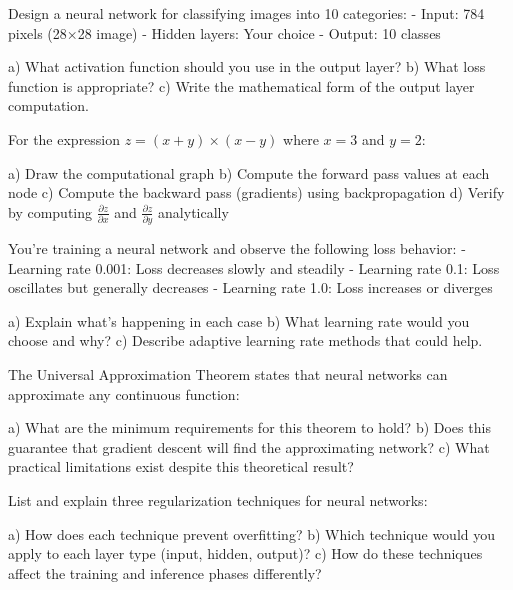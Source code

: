 \documentclass{article}
\begin{document}
\begin{problembox}[title= Multi-class Classification]

Design a neural network for classifying images into 10 categories:
- Input: 784 pixels (28×28 image)
- Hidden layers: Your choice
- Output: 10 classes

a) What activation function should you use in the output layer?
b) What loss function is appropriate?
c) Write the mathematical form of the output layer computation.
\end{problembox}

\begin{problembox}[title= Computational Graph]

For the expression $z = (x + y) \times (x - y)$ where $x = 3$ and $y = 2$:

a) Draw the computational graph
b) Compute the forward pass values at each node
c) Compute the backward pass (gradients) using backpropagation
d) Verify by computing $\frac{\partial z}{\partial x}$ and $\frac{\partial z}{\partial y}$ analytically
\end{problembox}

\begin{problembox}[title= Learning Rate Analysis]

You're training a neural network and observe the following loss behavior:
- Learning rate 0.001: Loss decreases slowly and steadily
- Learning rate 0.1: Loss oscillates but generally decreases
- Learning rate 1.0: Loss increases or diverges

a) Explain what's happening in each case
b) What learning rate would you choose and why?
c) Describe adaptive learning rate methods that could help.
\end{problembox}

\begin{problembox}[title= Universal Approximation]

The Universal Approximation Theorem states that neural networks can approximate any continuous function:

a) What are the minimum requirements for this theorem to hold?
b) Does this guarantee that gradient descent will find the approximating network?
c) What practical limitations exist despite this theoretical result?
\end{problembox}

\begin{problembox}[title= Regularization Techniques]

List and explain three regularization techniques for neural networks:

a) How does each technique prevent overfitting?
b) Which technique would you apply to each layer type (input, hidden, output)?
c) How do these techniques affect the training and inference phases differently?
\end{problembox}
\end{document}
